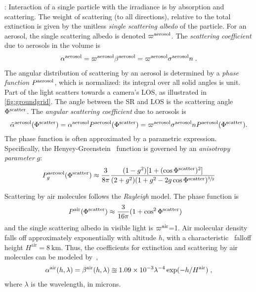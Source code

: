 \documentclass[10pt,letterpaper]{article}
\begin{document}
: Interaction of a single particle with the
irradiance is by absorption and scattering. The weight of scattering
(to all directions), relative to the total extinction is given by the
unitless {\em single scattering albedo} of the particle. For an
aerosol, the single scattering albedo is denoted $\varpi^{\rm
  aerosol}$.  The {\em scattering coefficient} due to aerosols in the
volume is
\begin{align}
  \alpha^{\rm aerosol}= \varpi^{\rm aerosol}\beta^{\rm aerosol}
  =\varpi^{\rm aerosol} \sigma^{\rm aerosol} n \;.
  \label{eq:alph}
\end{align}
The angular distribution of scattering by an aerosol is determined by
a {\em phase function} $P^{\rm aerosol}$, which is normalized: its
integral over all solid angles is unit. Part of the light scatters
towards a camera's LOS, as illustrated in \cref{fig:groundgrid}. The
angle between the SR and LOS is the scattering angle $\Phi^{\rm
  scatter}$. The {\em angular scattering coefficient} due to aerosols
is
\begin{align}
  \tilde\alpha^{\rm aerosol}(\Phi^{\rm scatter}) = \alpha^{\rm
    aerosol} P^{\rm aerosol}(\Phi^{\rm scatter}) = \varpi^{\rm
    aerosol} \sigma^{\rm aerosol} n P^{\rm aerosol}(\Phi^{\rm
    scatter}).
  \label{eq:alphabasic}
\end{align}
The phase function is often approximated by a parametric
expression. Specifically, the Henyey-Greenstein~\cite{cornette1992physically}
function is governed by an {\em anisotropy parameter} $g$:
\begin{align}
  P^{\rm aerosol}_g(\Phi^{\rm scatter})\approx \frac{3}{8\pi} \frac{(1 -g^2)
  [1+(\cos \Phi^{\rm scatter})^2]}
  {(2+g^2)(1 + g^2 - 2g\cos \Phi^{\rm scatter})^{\sfrac{3}{2}}}
  \label{eq:aerosol_scatter}
\end{align}

Scattering by air molecules follows the {\em Rayleigh} model. The
phase function is
\begin{align}
  P^{\rm air}(\Phi^{\rm scatter}) &\approx
  \frac{3}{16\pi}(1+\cos^2\Phi^{\rm scatter})
  \label{eq:rayleighP}
\end{align}
and the single scattering albedo in visible light is $\varpi^{\rm
  air}$=1. Air molecular density falls off approximately exponentially
with altitude $h$, with a characteristic~\cite{Levi1980} falloff
height $H^\mathrm{air}=8\ \si{\km}$. Thus, the
coefficients for extinction and scattering by air molecules can be
modeled by~\cite{Levi1980},
\begin{align}
  \alpha^{\rm air}(h, \lambda)=\beta^{\rm air}(h, \lambda) \approxeq
  1.09 \times 10^{-3}\lambda^{-4} \exp(-h/H^\mathrm{air})
  \;,%
  \label{eq:rayleighbeta}
\end{align}
where $\lambda$ is the wavelength, in microns.
\\
\end{document}
